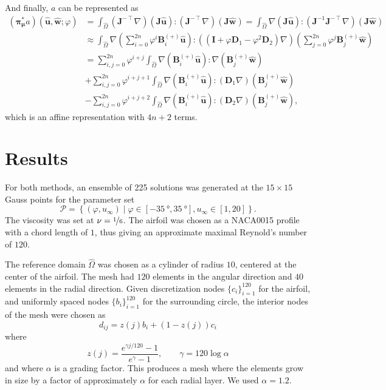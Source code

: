 \documentclass[onecolumn, twoside, a4paper, 11pt]{article}
\begin{document}
And finally, $a$ can be represented as
\begin{align}
  \nonumber
  ({\bm\pi}^*_{\bm\mu}a)(
    \hat{\bm u},
    \hat{\bm w};
    \varphi
  ) &= \int_{\hat{\Omega}}
      (\bm J^{-\intercal} \nabla) (\bm J \hat{\bm u}) :
      (\bm J^{-\intercal} \nabla) (\bm J \hat{\bm w})
    = \int_{\hat{\Omega}}
      \nabla (\bm J \hat{\bm u}) :
      (\bm J^{-1} \bm J^{-\intercal} \nabla) (\bm J \hat{\bm w}) \\
  \nonumber
    &\approx \int_{\hat{\Omega}}
      \nabla \left( \sum_{i=0}^{2n} \varphi^i \bm B^{(+)}_i \hat{\bm u} \right) :
      ((\bm I + \varphi \bm D_1 - \varphi^2 \bm D_2) \nabla)
      \left( \sum_{j=0}^{2n} \varphi^j \bm B^{(+)}_j \hat{\bm w} \right) \\
  \nonumber
    &= \sum_{i,j=0}^{2n} \varphi^{i+j} \int_{\hat{\Omega}}
      \nabla (\bm B^{(+)}_i \hat{\bm u}) : \nabla (\bm B^{(+)}_j \hat{\bm w}) \\
  \nonumber
    &+ \sum_{i,j=0}^{2n} \varphi^{i+j+1} \int_{\hat{\Omega}}
      \nabla (\bm B^{(+)}_i \hat{\bm u}) : (\bm D_1 \nabla) (\bm B^{(+)}_j \hat{\bm w}) \\
    &- \sum_{i,j=0}^{2n} \varphi^{i+j+2} \int_{\hat{\Omega}}
      \nabla (\bm B^{(+)}_i \hat{\bm u}) : (\bm D_2 \nabla) (\bm B^{(+)}_j \hat{\bm w}),
\end{align}
which is an affine representation with $4n+2$ terms.

\section{Results}
\label{sec:results}

For both methods, an ensemble of 225 solutions was generated at the
$15 \times 15$ Gauss points for the parameter set
\[
  \mathcal{P} = \left\{ (\varphi,u_\infty) \;|\;
    \varphi \in [-\SI{35}{\degree},\SI{35}{\degree}],
    u_\infty \in [1, 20]
  \right\}.
\]
The viscosity was set at $\nu = \nicefrac{1}{6}$. The airfoil was chosen as a
NACA0015 profile with a chord length of $1$, thus giving an approximate maximal
Reynold's number of $120$.

The reference domain $\hat{\Omega}$ was chosen as a cylinder of radius $10$,
centered at the center of the airfoil. The mesh had $120$ elements in
the angular direction and $40$ elements in the radial direction. Given
discretization nodes $\{c_i\}_{i=1}^{120}$ for the airfoil, and
uniformly spaced nodes $\{b_i\}_{i=1}^{120}$ for the surrounding
circle, the interior nodes of the mesh were chosen as
\begin{equation}
  \label{eq:meshgen}
  d_{ij} = z(j) b_i + (1 - z(j)) c_i
\end{equation}
where
\[
  z(j) = \frac{e^{\gamma j / 120} - 1}{e^{\gamma} - 1}, \qquad
  \gamma = 120 \log{\alpha}
\]
and where $\alpha$ is a grading factor. This produces a mesh where the elements grow in size by a
factor of approximately $\alpha$ for each radial layer. We used $\alpha = 1.2$.
\end{document}
